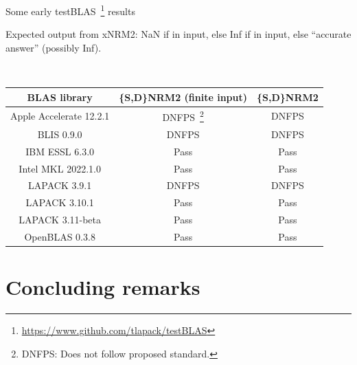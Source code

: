 \documentclass[11pt]{beamer}
\begin{document}
\begin{frame}{Some early testBLAS~\footnote{\url{https://www.github.com/tlapack/testBLAS}} results}

	Expected output from xNRM2: NaN if in input, else Inf if in input, else ``accurate answer'' (possibly Inf).

	~\\
		\centering
		\begin{tabular}{|c|c|c|}
			\hline
			BLAS library & \{S,D\}NRM2 (finite input) & \{S,D\}NRM2 \\\hline
			Apple Accelerate 12.2.1 & {DNFPS~\footnote{DNFPS: Does not follow proposed standard.}} & {DNFPS} \\\hline
			BLIS 0.9.0 & {DNFPS} & {DNFPS} \\\hline
			IBM ESSL 6.3.0 & {\color{codegreen} Pass} & {\color{codegreen} Pass} \\\hline
			Intel MKL 2022.1.0 & {\color{codegreen} Pass} & {\color{codegreen} Pass} \\\hline
			LAPACK 3.9.1 & {DNFPS} & {DNFPS} \\\hline
			LAPACK 3.10.1 & {\color{codegreen} Pass} & {\color{codegreen} Pass} \\\hline
			LAPACK 3.11-beta & {\color{codegreen} Pass} & {\color{codegreen} Pass} \\\hline
			OpenBLAS 0.3.8 & {\color{codegreen} Pass} & {\color{codegreen} Pass} \\\hline
		\end{tabular}


\end{frame}

\section{Concluding remarks}
\end{document}
